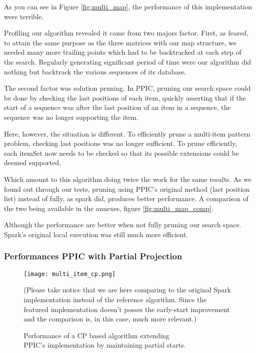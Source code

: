\documentclass{eplmastersthesis}
\begin{document}
As you can see in Figure \ref{fig:multi_map}, the performance of this implementation were terrible. \newline

Profiling our algorithm revealed it came from two majors factor. First, as feared, to attain the same purpose as the three matrices with our map structure, we needed many more trailing points which had to be backtracked at each step of the search. Regularly generating significant period of time were our algorithm did nothing but backtrack the various sequences of its database. \newline

The second factor was solution pruning. In PPIC, pruning our search space could be done by checking the last positions of each item, quickly asserting that if the start of a sequence was after the last position of an item in a sequence, the sequence was no longer supporting the item. \newline

Here, however, the situation is different. To efficiently prune a multi-item pattern problem, checking last positions was no longer sufficient. To prune efficiently, each itemSet now needs to be checked so that its possible extensions could be deemed supported. \newline

Which amount to this algorithm doing twice the work for the same results. As we found out through our tests, pruning using PPIC's original method (last position list) instead of fully, as spark did, produces better performance. A comparison of the two being available in the annexes, figure \ref{fig:multi_map_comp}. \newline

Although the performance are better when not fully pruning our search space. Spark's original local execution was still much more efficient.

\subsubsection{Performances PPIC with Partial Projection}

\begin{figure}[h]
  \centering
  \texttt{[image: multi\_item\_cp.png]}
  \caption[PPIC with partial starts]{
  		Performance of a CP based algorithm extending \\
  		PPIC's implementation by maintaining partial starts.
  	\endtabular
  }
  \label{fig:multi_array}
  (Please take notice that we are here comparing to the original Spark implementation instead of the reference algorithm. Since the featured implementation doesn't posses the early-start improvement and the comparison is, in this case, much more relevant.)
\end{figure}
\end{document}
